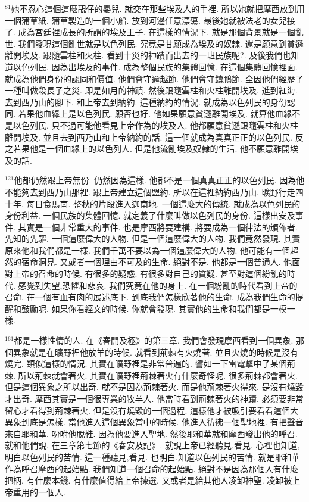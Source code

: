 \documentclass{book}
\begin{document}
$^{81}$她不忍心這個這麼靚仔的嬰兒.
就交在那些埃及人的手裡.
所以她就把摩西放到用一個蒲草紙.
蒲草製造的一個小船.
放到河邊任意漂蕩.
最後她就被法老的女兒接了.
成為宮廷裡成長的所謂的埃及王子.
在這樣的情況下.
就是那個背景就是一個亂世.
我們發現這個亂世就是以色列民.
究竟是甘願成為埃及的奴隸.
還是願意到貧遜離開埃及.
跟隨雲柱和火柱.
看到十災的神蹟而出去的一班民族呢?.
及後我們也知道以色列民.
因為出埃及的事件.
成為整個民族的集體回憶.
在這個集體回憶裡面.
就成為他們身份的認同和價值.
他們會守逾越節.
他們會守鑄鵬節.
全因他們經歷了一種叫做殺長子之災.
即是如月的神蹟.
然後跟隨雲柱和火柱離開埃及.
進到紅海.
去到西乃山的腳下.
和上帝去到納約.
這種納約的情況.
就成為以色列民的身份認同.
若果他血緣上是以色列民.
願否也好.
他如果願意貧遜離開埃及.
就算他血緣不是以色列民.
只不過可能他看見上帝作為的埃及人.
他都願意貧遜跟隨雲柱和火柱離開埃及.
並且去到西乃山和上帝納約的話.
這一個就成為真真正正的以色列民.
反之若果他是一個血緣上的以色列人.
但是他流亂埃及奴隸的生活.
他不願意離開埃及的話.

$^{121}$他都仍然跟上帝無份.
仍然因為這樣.
他都不是一個真真正正的以色列民.
因為他不能夠去到西乃山那裡.
跟上帝建立這個盟約.
所以在這裡納約西乃山.
曠野行走四十年.
每日食馬南.
整秋的片段進入迦南地.
一個這麼大的傳統.
就成為以色列民的身份利益.
一個民族的集體回憶.
就定義了什麼叫做以色列民的身份.
這樣出安及事件.
其實是一個非常重大的事件.
也是摩西將要建構.
將要成為一個律法的頒佈者.
先知的先驅.
一個這麼偉大的人物.
但是一個這麼偉大的人物.
我們竟然發現.
其實原來他和我們都是一樣.
我們千萬不要以為一個這麼偉大的人物.
他可能有一個超然的宿命洞見.
又或者一個理由不可及的生命.
絕對不是.
他都是一個普通人.
他面對上帝的召命的時候.
有很多的疑惑.
有很多對自己的質疑.
甚至對這個紛亂的時代.
感覺到失望,恐懼和悲哀.
我們究竟在他的身上.
在一個紛亂的時代看到上帝的召命.
在一個有血有肉的展述底下.
到底我們怎樣欣著他的生命.
成為我們生命的提醒和鼓勵呢.
如果你看經文的時候.
你就會發現.
其實他的生命和我們都是一模一樣.

$^{161}$都是一樣性情的人.
在《春開及極》的第三章.
我們會發現摩西看到一個異象.
那個異象就是在曠野裡他放羊的時候.
就看到荊棘有火燒著.
並且火燒的時候是沒有燒完.
類似這樣的情況.
其實在曠野裡是非常普遍的.
譬如一下雷電擊中了某個荊棘.
所以荊棘就會著火.
其實在曠野裡荊棘著火有什麼奇怪呢.
很多荊棘都會著火.
但是這個異象之所以出奇.
就不是因為荊棘著火.
而是他荊棘著火得來.
是沒有燒毀才出奇.
摩西其實是一個很專業的牧羊人.
他當時看到荊棘著火的神蹟.
必須要非常留心才看得到荊棘著火.
但是沒有燒毀的一個過程.
這樣他才被吸引要看看這個大異象到底是怎樣.
當他進入這個異象當中的時候.
他進入彷彿一個聖地裡.
有把聲音來自耶和華.
吩咐他脫鞋.
因為他要進入聖地.
然後耶和華就和摩西發出他的呼召.
就和他們說.
在三章第七節的《春安及記》.
就說上帝已經聽見,看見.
心裡也知道,明白以色列民的苦情.
這一種聽見,看見.
也明白,知道以色列民的苦情.
就是耶和華作為呼召摩西的起始點.
我們知道一個召命的起始點.
絕對不是因為那個人有什麼把柄.
有什麼本錢.
有什麼值得給上帝揀選.
又或者是給其他人凌卸神聖.
凌卸被上帝重用的一個人.
\end{document}
